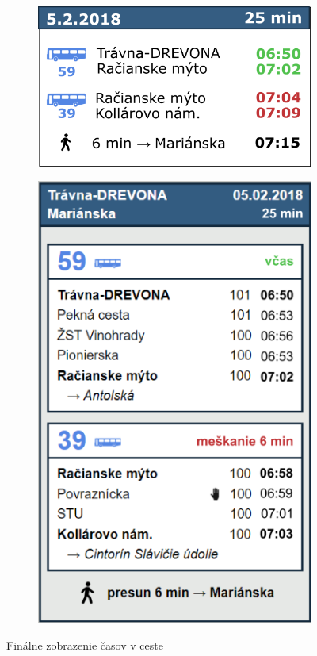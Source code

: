 \begin{figure}[H]
\centering
	\begin{subfigure}[b]{0.48\textwidth}
		\centering
 		\includegraphics[width=0.7\linewidth]{images/time-view3}
	\end{subfigure}
	\begin{subfigure}[b]{0.48\textwidth}
		\centering
		\includegraphics[width=0.68\linewidth]{images/time-view-detail}
	\end{subfigure}
	\caption[Finálne zobrazenie časov v ceste]{Finálne zobrazenie časov v ceste}
	\label{fig:time-view-good}
\end{figure}

